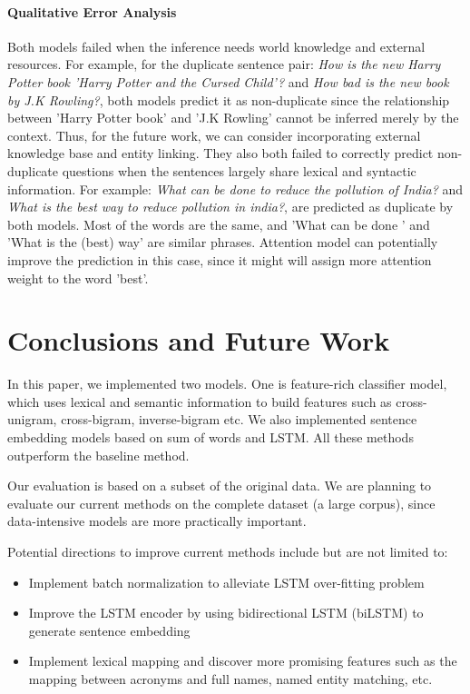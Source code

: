 \documentclass[11pt,a4paper]{article}
\begin{document}
\paragraph{Qualitative Error Analysis} Both models failed when the inference needs world knowledge and external resources. For example, for the duplicate sentence pair: \textit{How is the new Harry Potter book 'Harry Potter and the Cursed Child'?} and \textit{How bad is the new book by J.K Rowling?}, both models predict it as non-duplicate since the relationship between 'Harry Potter book' and 'J.K Rowling' cannot be inferred merely by the context. Thus, for the future work, we can consider incorporating external knowledge base and entity linking.  They also both failed to correctly predict non-duplicate questions when the sentences largely share lexical and syntactic information. For example:  \textit{What can be done to reduce the pollution of India?} and \textit{What is the best way to reduce pollution in india?}, are predicted as duplicate by both models. Most of the words are the same, and 'What can be done ' and 'What is the (best) way' are similar phrases. Attention model can potentially improve the prediction in this case, since it might will assign more attention weight to the word 'best'.

\section{Conclusions and Future Work}
In this paper, we implemented two models. One is feature-rich classifier model, which uses lexical and semantic information to build features such as cross-unigram, cross-bigram, inverse-bigram etc. We also implemented sentence embedding models based on sum of words and LSTM. All these methods outperform the baseline method.

 Our evaluation is based on a subset of the original data. We are planning to evaluate our current methods on the complete dataset (a large corpus), since data-intensive models are more practically important. 

Potential directions to improve current methods include but are not limited to: 
\begin{itemize}
    \item Implement batch normalization to alleviate LSTM over-fitting problem
    \item Improve the LSTM encoder by using bidirectional LSTM (biLSTM) to generate sentence embedding
    \item Implement lexical mapping and discover more promising features such as the mapping between acronyms and full names, named entity matching, etc.
\end{itemize}

%
%
{}


\end{document}
